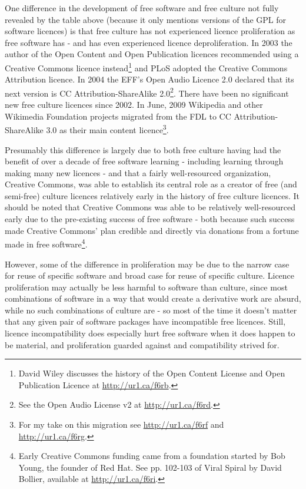 One dif\hbox{}ference in the development of free software and free culture not
fully revealed by the table above (because it only mentions versions of the GPL
for software licences) is that free culture has not experienced licence
proliferation as free software has - and has even experienced licence
deproliferation. In 2003 the author of the Open Content and Open Publication
licences recommended using a Creative Commons licence instead\footnote{David
Wiley discusses the history of the Open Content License and Open Publication
Licence at \url{http://ur1.ca/f6rb}.} and PLoS adopted the Creative Commons
Attribution licence. In 2004 the EFF's Open Audio Licence 2.0 declared that its
next version is CC Attribution-ShareAlike 2.0\footnote{See the Open Audio
License v2 at \url{http://ur1.ca/f6rd}.}. There have been no signif\hbox{}icant
new free culture licences since 2002. In June, 2009  Wikipedia and other
Wikimedia Foundation projects migrated from the FDL to CC Attribution-ShareAlike
3.0 as their main content licence\footnote{For my take on this migration see
\url{http://ur1.ca/f6rf} and \url{http://ur1.ca/f6rg}.}.

Presumably this dif\hbox{}ference is largely due to both free culture having had
the benef\hbox{}it of over a decade of free software learning - including
learning through making many new licences - and that a fairly well-resourced
organization, Creative Commons, was able to establish its central role as a
creator of free (and semi-free) culture licences relatively early in the history
of free culture licences. It should be noted that Creative Commons was able to
be relatively well-resourced early due to the pre-existing success of free
software - both because such success made Creative Commons' plan credible and
directly via donations from a fortune made in free software\footnote{Early
Creative Commons funding came from a foundation started by Bob Young, the
founder of Red Hat. See pp. 102-103 of Viral Spiral by David Bollier, available
at \url{http://ur1.ca/f6ri}.}.

However, some of the dif\hbox{}ference in proliferation may be due to the narrow
case for reuse of specif\hbox{}ic software and broad case for reuse of
specif\hbox{}ic culture.  Licence proliferation may actually be less harmful to
software than culture, since most combinations of software in a way that would
create a derivative work are absurd, while no such combinations of culture are -
so most of the time it doesn't matter that any given pair of software packages
have incompatible free licences. Still, licence incompatibility does especially
hurt free software when it does happen to be material, and proliferation guarded
against and compatibility strived for.


